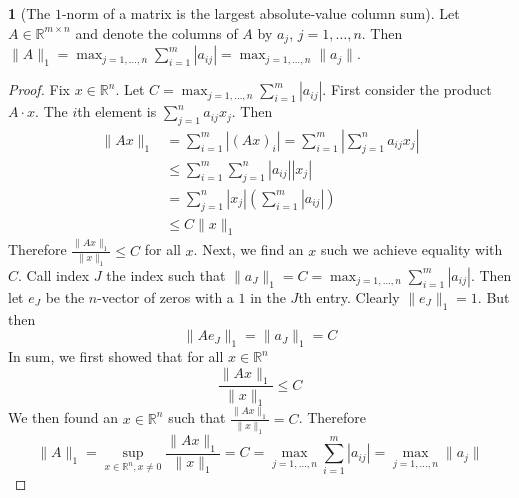 \documentclass[12pt]{article}
\theoremstyle{definition}
\newtheorem{theorem}{\color{ForestGreen}{\textbf{Theorem}}}
\newcommand{\R}{\mathbb{R}}
\newcommand{\norm}[1]{\lVert#1\rVert}
\theoremstyle{definition}
\begin{document}
\begin{theorem}[The $1$-norm of a matrix is the largest absolute-value column sum]
Let $A \in \R^{m \times n }$ and denote the columns of $A$ by $a_j$, $j=1, \ldots, n$. Then $\norm{A}_1 = \max_{j=1, \ldots, n} \sum_{i=1}^{m} |a_{ij}| =  \max_{j=1, \ldots, n} \norm{a_j}$.
\end{theorem}
\begin{proof}
Fix $x \in \R^n$. Let $C = \max_{j=1, \ldots, n} \sum_{i=1}^{m} |a_{ij}|$. First consider the product $A\cdot x$. The $i$th element is $\sum_{j=1}^n a_{ij} x_j$. Then
\begin{align*}
	\norm{Ax}_1 &= \sum_{i=1}^m |(Ax)_i | = \sum_{i=1}^m |\sum_{j=1}^n a_{ij} x_j| \\
	&\leq \sum_{i=1}^m \sum_{j=1}^n |a_{ij}| |x_j| \tag{triangle inequality} \\
	&= \sum_{j=1}^n |x_j| \left(\sum_{i=1}^m |a_{ij}| \right) \tag{interchange order of summation, assumed finite} \\
	&\leq C \norm{x}_1
\end{align*}
Therefore $\frac{\norm{Ax}_1}{\norm{x}_1} \leq C$ for all $x$. Next, we find an $x$ such we achieve equality with $C$. Call index $J$ the index such that $\norm{a_J}_1 = C = \max_{j=1, \ldots, n} \sum_{i=1}^{m} |a_{ij}|$. Then let $e_J$ be the $n$-vector of zeros with a $1$ in the $J$th entry. Clearly $\norm{e_J}_1 = 1$. But then
\begin{equation}
 	\norm{A e_J}_1 = \norm{a_J}_1 = C
\end{equation} 
In sum, we first showed that for all $x \in \R^n$
\begin{equation}
	\frac{\norm{Ax}_1}{\norm{x}_1} \leq C
\end{equation}
We then found an $x \in \R^n$ such that $\frac{\norm{Ax}_1}{\norm{x}_1} = C$. Therefore 
\begin{equation}
	\norm{A}_1 = \sup_{x \in \R^n, x\neq 0} \frac{\norm{Ax}_1}{\norm{x}_1} = C = \max_{j=1, \ldots, n} \sum_{i=1}^{m} |a_{ij}| =  \max_{j=1, \ldots, n} \norm{a_j}
\end{equation}
\end{proof}
\end{document}

